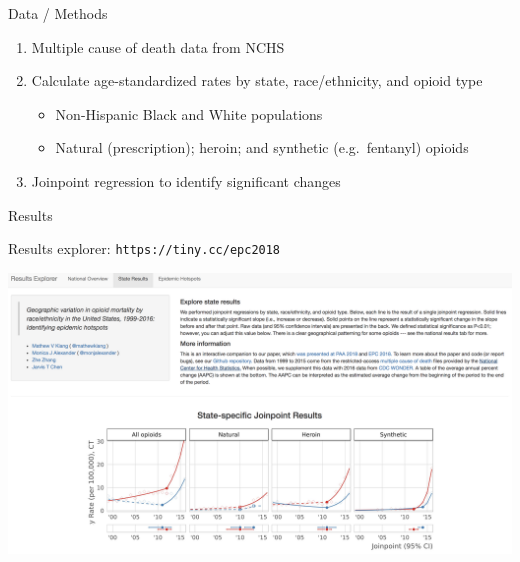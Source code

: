 \documentclass[ignorenonframetext,compress]{beamer}
\providecommand{\tightlist}{%
  \setlength{\itemsep}{0pt}\setlength{\parskip}{0pt}}
\begin{document}
\begin{frame}{Data / Methods}

\begin{enumerate}
\def\labelenumi{\arabic{enumi}.}
\tightlist
\item
  Multiple cause of death data from NCHS
\item
  Calculate age-standardized rates by state, race/ethnicity, and opioid
  type

  \begin{itemize}
  \tightlist
  \item
    Non-Hispanic Black and White populations
  \item
    Natural (prescription); heroin; and synthetic (e.g.~fentanyl)
    opioids
  \end{itemize}
\item
  Joinpoint regression to identify significant changes
\end{enumerate}

\end{frame}

\begin{frame}{Results}

Results explorer: \texttt{https://tiny.cc/epc2018}

\begin{center}
\includegraphics[width=1.0\textwidth]{screenshot.png}
\end{center}

\end{frame}
\end{document}
